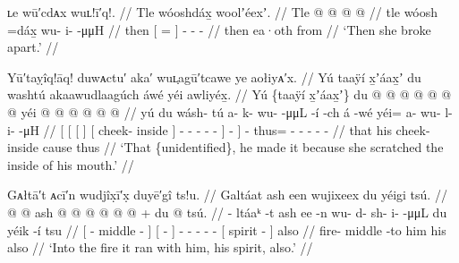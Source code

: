 \ex\label{ex:91-111-she-broke-apart}%
%
\begingl
	\glpreamble	ʟe wū′cdᴀx wuʟ!ī′q!. //
	\glpreamble	Tle wóoshdáx̱ woolʼéexʼ. //
	\gla	Tle {}  @ {} {}
		 @ {} @ {} @ {} //
	\glb	tle {} wóosh =dáx̱ {}
		wu- i-  -μμH //
	\glc	then {}[  = {}]
		- -  - //
	\gld	then {} ea·oth \•from {}
		 {} {} {} //
	\glft	‘Then she broke apart.’
		//
\endgl
\xe

\ex\label{ex:91-112-made-it-because-scratched-his-mouth}%
%
\begingl
	\glpreamble	Yū′taỵîq!āq! duwᴀctu′ aka′ wuʟ̣agū′tcawe ye aołiyᴀ′x. //
	\glpreamble	Yú taaÿí x̱ʼáax̱ʼ du washtú akaawudlaagúch áwé yéi awliyéx̱. //
	\gla	{} {} {} Yú \{taaÿí x̱ʼáax̱ʼ\} {}
			{} du  @ {} {}
			 @ {} @ {} @ {} @ {} @ {} {} {} {}  @ {}
		yéi @  @ {} @ {} @ {} @ {} @ {} //
	\glb	{} {} {} yú \xx{unid}  {}
			{} du wásh- tú {}
			a- k- wu-  -μμL -í {}
				-ch {} á -wé
		yéi= a- wu- l- i-  -μH //
	\glc	{}[ {}[ {}[    {}]
			{}[  cheek- inside {}]
			- - -  - -\xx{sub} {}]
				- {}]  -\xx{mdst}
		thus= - - - -  -\xx{var} //
	\gld	{} {} {} that   {}
			{} his cheek- inside {}
			 {} {} {} {} {} {} \·cause {} \rlap{it.is} {}
		thus  {} {} {} {} {} //
	\glft	‘That \{unidentified\}, he made it because she scratched the inside of his mouth.’
		//
\endgl
\xe


\ex\label{ex:91-113-also-ran-into-fire-with-him}%
%
\begingl
	\glpreamble	Gᴀłtā′t ᴀcī′n wudjîx̣ī′x̣ duyē′gî ts!u. //
	\glpreamble	Galtáat ash een wujixeex du yéigi tsú. //
	\gla	{}  @ {} @ {} {}
		{} ash  @ {} {}
		 @ {} @ {} @ {} @ {} @ {} +
		{} du  @ {} {} tsú. //
	\glb	{} - ltáaᵏ -t {}
		{} ash ee -n {}
		wu- d- sh- i-  -μμL
		{} du yéik -í {} tsu //
	\glc	{}[ - middle -\xx{pnct} {}]
		{}[   -\xx{instr} {}]
		- - - -  -
		{}[  spirit - {}] also //
	\gld	{} fire- middle -to {}
		{} him  {} {}
		 {} {} {} {} {}
		{} his  {} {} also //
	\glft	‘Into the fire it ran with him, his spirit, also.’
		//
\endgl
\xe

